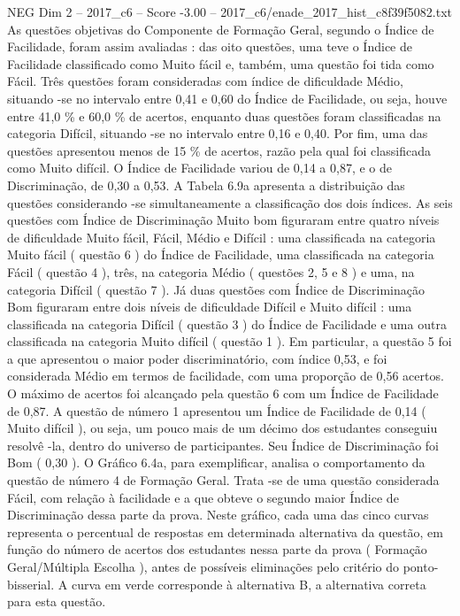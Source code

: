\begin{textsample}{NEG Dim 2 – 2017\_c6 – Score -3.00 – 2017\_c6/enade\_2017\_hist\_c8f39f5082.txt}
As questões objetivas do Componente de Formação Geral, segundo o Índice de Facilidade, foram assim avaliadas : das oito questões, uma teve o Índice de Facilidade classificado como Muito fácil e, também, uma questão foi tida como Fácil.
Três questões foram consideradas com índice de dificuldade Médio, situando -se no intervalo entre 0,41 e 0,60 do Índice de Facilidade, ou seja, houve entre 41,0 \% e 60,0 \% de acertos, enquanto duas questões foram classificadas na categoria Difícil, situando -se no intervalo entre 0,16 e 0,40.
Por fim, uma das questões apresentou menos de 15 \% de acertos, razão pela qual foi classificada como Muito difícil.
O Índice de Facilidade variou de 0,14 a 0,87, e o de Discriminação, de 0,30 a 0,53.
A Tabela 6.9a apresenta a distribuição das questões considerando -se simultaneamente a classificação dos dois índices.
As seis questões com Índice de Discriminação Muito bom figuraram entre quatro níveis de dificuldade Muito fácil, Fácil, Médio e Difícil : uma classificada na categoria Muito fácil ( questão 6 ) do Índice de Facilidade, uma classificada na categoria Fácil ( questão 4 ), três, na categoria Médio ( questões 2, 5 e 8 ) e uma, na categoria Difícil ( questão 7 ).
Já duas questões com Índice de Discriminação Bom figuraram entre dois níveis de dificuldade Difícil e Muito difícil : uma classificada na categoria Difícil ( questão 3 ) do Índice de Facilidade e uma outra classificada na categoria Muito difícil ( questão 1 ).
Em particular, a questão 5 foi a que apresentou o maior poder discriminatório, com índice 0,53, e foi considerada Médio em termos de facilidade, com uma proporção de 0,56 acertos.
O máximo de acertos foi alcançado pela questão 6 com um Índice de Facilidade de 0,87.
A questão de número 1 apresentou um Índice de Facilidade de 0,14 ( Muito difícil ), ou seja, um pouco mais de um décimo dos estudantes conseguiu resolvê -la, dentro do universo de participantes.
Seu Índice de Discriminação foi Bom ( 0,30 ).
O Gráfico 6.4a, para exemplificar, analisa o comportamento da questão de número 4 de Formação Geral.
Trata -se de uma questão considerada Fácil, com relação à facilidade e a que obteve o segundo maior Índice de Discriminação dessa parte da prova.
Neste gráfico, cada uma das cinco curvas representa o percentual de respostas em determinada alternativa da questão, em função do número de acertos dos estudantes nessa parte da prova ( Formação Geral/Múltipla Escolha ), antes de possíveis eliminações pelo critério do ponto-bisserial.
A curva em verde corresponde à alternativa B, a alternativa correta para esta questão.

\end{textsample}
